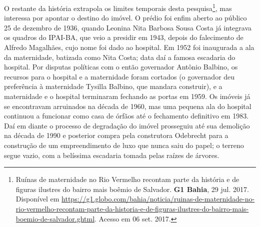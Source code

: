 O restante da história extrapola os limites temporais desta pesquisa\footnote{Ruínas de maternidade no Rio Vermelho recontam parte da história e de figuras ilustres do bairro mais boêmio de Salvador. \textbf{G1 Bahia}, 29 jul. 2017. Disponível em \url{https://g1.globo.com/bahia/noticia/ruinas-de-maternidade-no-rio-vermelho-recontam-parte-da-historia-e-de-figuras-ilustres-do-bairro-mais-boemio-de-salvador.ghtml}. Acesso em 06 set. 2017.}, mas interessa por apontar o destino do imóvel. O prédio foi enfim aberto ao público 25 de dezembro de 1936, quando Leonina Nita Barbosa Sousa Costa já integrava os quadros do IPAI-BA, que veio a presidir em 1943, depois do falecimento de Alfredo Magalhães, cujo nome foi dado ao hospital. Em 1952 foi inaugurada a ala da maternidade, batizada como Nita Costa; data daí a famosa escadaria do hospital. Por disputas políticas com o então governador Antônio Balbino, os recursos para o hospital e a maternidade foram cortados (o governador deu preferência à maternidade Tysilla Balbino, que mandara construir), e a maternidade e o hospital terminaram fechando as portas em 1959. Os imóveis já se encontravam arruinados na década de 1960, mas uma pequena ala do hospital continuou a funcionar como casa de órfãos até o fechamento definitivo em 1983. Daí em diante o processo de degradação do imóvel prosseguiu até sua demolição na década de 1990 e posterior compra pela construtora Odebrecht para a construção de um empreendimento de luxo que nunca saiu do papel; o terreno segue vazio, com a belíssima escadaria tomada pelas raízes de árvores.

